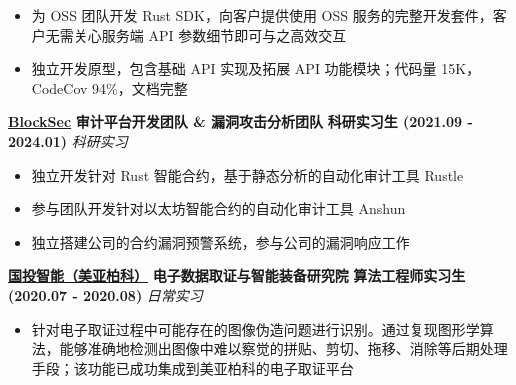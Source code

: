     \begin{itemize}
        \item 为 OSS 团队开发 Rust SDK，向客户提供使用 OSS 服务的完整开发套件，客户无需关心服务端 API 参数细节即可与之高效交互
        \item 独立开发原型，包含基础 API 实现及拓展 API 功能模块；代码量 15K，CodeCov 94\%，文档完整
    \end{itemize}

    \noindent \textbf{\href{https://blocksec.com}{BlockSec}} \textbar{} \textbf{审计平台开发团队 \& 漏洞攻击分析团队} \textbar{} \textbf{科研实习生 (2021.09 - 2024.01)} \hfill \textsl{科研实习}

    \begin{itemize}
        \item 独立开发针对 Rust 智能合约，基于静态分析的自动化审计工具 Rustle
        \item 参与团队开发针对以太坊智能合约的自动化审计工具 Anshun
        \item 独立搭建公司的合约漏洞预警系统，参与公司的漏洞响应工作
    \end{itemize}

    \noindent \textbf{\href{https://300188.cn}{国投智能（美亚柏科）}} \textbar{} \textbf{电子数据取证与智能装备研究院} \textbar{} \textbf{算法工程师实习生 (2020.07 - 2020.08)} \hfill \textsl{日常实习}


    \begin{itemize}
        \item 针对电子取证过程中可能存在的图像伪造问题进行识别。通过复现图形学算法，能够准确地检测出图像中难以察觉的拼贴、剪切、拖移、消除等后期处理手段；该功能已成功集成到美亚柏科的电子取证平台
    \end{itemize}

\fi

\hfill
